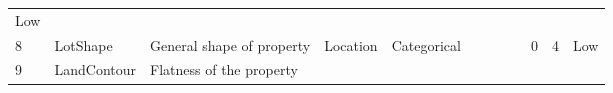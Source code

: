 \documentclass[11pt]{article}
\begin{document}
\begin{longtable}[]{@{}llllllllllll@{}}
\begin{minipage}[t]{0.04\columnwidth}
Low\strut
\end{minipage}\tabularnewline
\begin{minipage}[t]{0.04\columnwidth}\raggedright\strut
8\strut
\end{minipage} & \begin{minipage}[t]{0.04\columnwidth}\raggedright\strut
LotShape\strut
\end{minipage} & \begin{minipage}[t]{0.04\columnwidth}\raggedright\strut
General shape of property\strut
\end{minipage} & \begin{minipage}[t]{0.04\columnwidth}\raggedright\strut
Location\strut
\end{minipage} & \begin{minipage}[t]{0.04\columnwidth}\raggedright\strut
Categorical\strut
\end{minipage} & \begin{minipage}[t]{0.04\columnwidth}\raggedright\strut
\strut
\end{minipage} & \begin{minipage}[t]{0.04\columnwidth}\raggedright\strut
\strut
\end{minipage} & \begin{minipage}[t]{0.04\columnwidth}\raggedright\strut
\strut
\end{minipage} & \begin{minipage}[t]{0.04\columnwidth}\raggedright\strut
\strut
\end{minipage} & \begin{minipage}[t]{0.04\columnwidth}\raggedright\strut
0\strut
\end{minipage} & \begin{minipage}[t]{0.04\columnwidth}\raggedright\strut
4\strut
\end{minipage} & \begin{minipage}[t]{0.04\columnwidth}\raggedright\strut
Low\strut
\end{minipage}\tabularnewline
\begin{minipage}[t]{0.04\columnwidth}\raggedright\strut
9\strut
\end{minipage} & \begin{minipage}[t]{0.04\columnwidth}\raggedright\strut
LandContour\strut
\end{minipage} & \begin{minipage}[t]{0.04\columnwidth}\raggedright\strut
Flatness of the property\strut
\end{minipage} & \begin{minipage}[t]{0.04\columnwidth}\raggedright\strut

\end{minipage}
\end{longtable}
\end{document}
